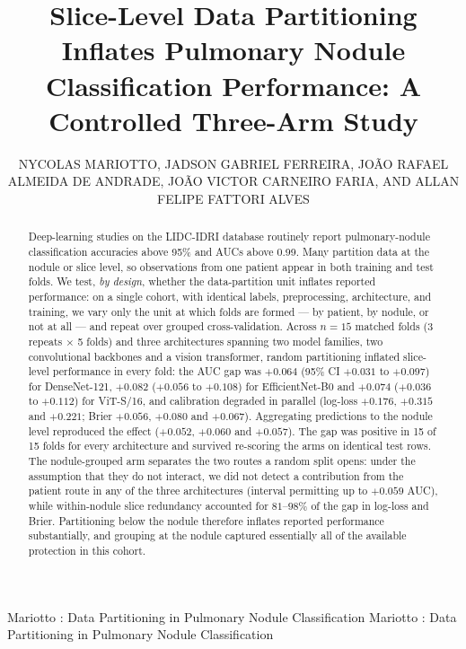 \documentclass{ieeeaccess}
\begin{document}

\title{Slice-Level Data Partitioning Inflates Pulmonary Nodule Classification Performance:
A Controlled Three-Arm Study}

\author{\uppercase{Nycolas Mariotto},
\uppercase{Jadson Gabriel Ferreira},
\uppercase{Jo\~ao Rafael Almeida de Andrade},
\uppercase{Jo\~ao Victor Carneiro Faria},
AND \uppercase{Allan Felipe Fattori Alves}}
\address[1]{Institute of Biosciences, S\~ao Paulo State University (UNESP), Botucatu, S\~ao Paulo 18618-689, Brazil}


\markboth
{Mariotto \headeretal: Data Partitioning in Pulmonary Nodule Classification}
{Mariotto \headeretal: Data Partitioning in Pulmonary Nodule Classification}


\begin{abstract}
Deep-learning studies on the LIDC-IDRI database routinely report pulmonary-nodule classification
accuracies above 95\% and AUCs above 0.99. Many partition data at the nodule or slice level, so
observations from one patient appear in both training and test folds. We test, \emph{by design},
whether the data-partition unit inflates reported performance: on a single cohort, with identical
labels, preprocessing, architecture, and training, we vary only the unit at which folds are formed
--- by patient, by nodule, or not at all --- and repeat over grouped cross-validation. Across $n=15$
matched folds (3 repeats $\times$ 5 folds) and three architectures spanning two model families, two
convolutional backbones and a vision transformer, random partitioning inflated slice-level
performance in every fold: the AUC gap was $+0.064$ (95\% CI $+0.031$ to $+0.097$) for DenseNet-121,
$+0.082$ ($+0.056$ to $+0.108$) for EfficientNet-B0 and $+0.074$ ($+0.036$ to $+0.112$) for
ViT-S/16, and calibration degraded in parallel (log-loss $+0.176$, $+0.315$ and $+0.221$; Brier
$+0.056$, $+0.080$ and $+0.067$). Aggregating predictions to the nodule level reproduced the effect
($+0.052$, $+0.060$ and $+0.057$). The gap was positive in 15 of 15 folds for every architecture
and survived re-scoring the arms on identical test rows. The nodule-grouped arm separates the
two routes a random split opens: under the assumption that they do not interact, we did not detect a
contribution from the patient route in any of the three architectures (interval permitting up to
$+0.059$ AUC), while within-nodule slice redundancy accounted for $81$--$98\%$ of the gap in
log-loss and Brier.
Partitioning below the nodule therefore inflates reported performance substantially, and grouping at
the nodule captured essentially all of the available protection in this cohort.
\end{abstract}
\end{document}
